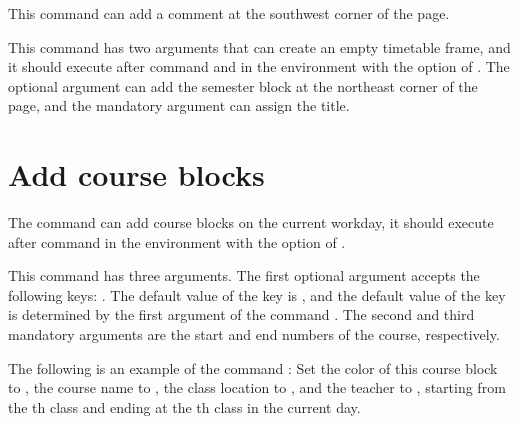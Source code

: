 \documentclass[letterpaper]{l3doc}
\begin{document}
\begin{function}{\more}
  \begin{syntax}
  \end{syntax}

  This command can add a comment at the southwest corner of the page.
\end{function}

\begin{function}{\maketable}
  \begin{syntax}
                
  \end{syntax}

  This command has two arguments that can create an empty timetable frame, and it should execute after command  and  in the  environment with the option of . The optional argument can add the semester block at the northeast corner of the page, and the mandatory argument can assign the title.
\end{function}

\section{Add course blocks}

\begin{function}{\course}
  \begin{syntax}
  \end{syntax}
\end{function}

The  command can add course blocks on the current workday, it should execute after command  in the  environment with the option of .

This command has three arguments. The first optional argument accepts the following keys:     . The default value of the key  is , and the default value of the key  is determined by the first argument of the command . The second and third mandatory arguments are the start and end numbers of the course, respectively.

The following is an example of the command : Set the color of this course block to , the course name to , the class location to , and the teacher to , starting from the th class and ending at the th class in the current day.
\end{document}
